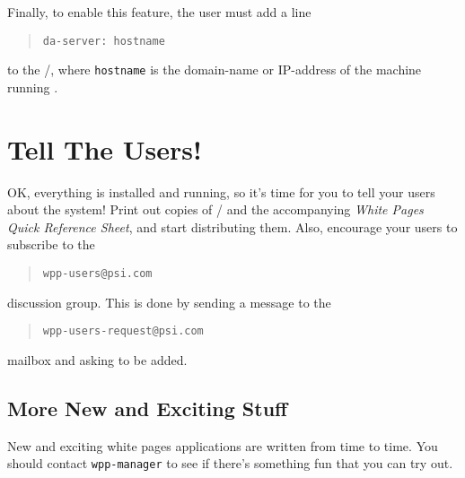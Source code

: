 Finally,
to enable this feature,
the user must add a line
\begin{quote}\small\begin{verbatim}
da-server: hostname
\end{verbatim}\end{quote}
to the \profile/,
where \verb"hostname" is the domain-name or IP-address of the machine running
.

\section	{Tell The Users!}
OK, everything is installed and running,
so it's time for you to tell your users about the system!
Print out copies of \thebook/ and the accompanying
{\em White Pages Quick Reference Sheet},
and start distributing them.
Also, encourage your users to subscribe to the 
\begin{quote}\begin{verbatim}
wpp-users@psi.com
\end{verbatim}\end{quote}
discussion group.
This is done by sending a message to the
\begin{quote}\begin{verbatim}
wpp-users-request@psi.com
\end{verbatim}\end{quote}
mailbox and asking to be added.

\subsection	{More New and Exciting Stuff}
New and exciting white pages applications are written from time to time.
You should contact \verb"wpp-manager" to see if there's something fun that you
can try out.
